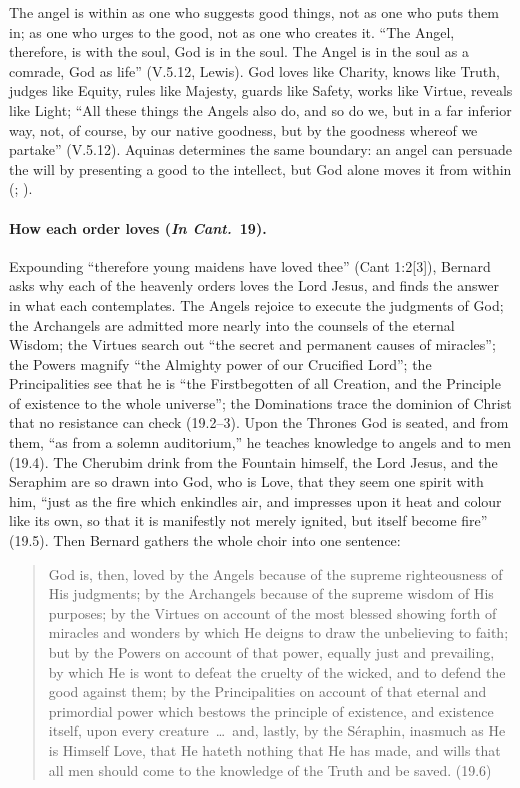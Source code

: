\noindent The angel is within as one who suggests good things, not as one
who puts them in; as one who urges to the good, not as one who creates it.
``The Angel, therefore, is with the soul, God is in the soul. The Angel is
in the soul as a comrade, God as life'' (V.5.12, Lewis). God loves like
Charity, knows like Truth, judges like Equity, rules like Majesty, guards
like Safety, works like Virtue, reveals like Light; ``All these things the
Angels also do, and so do we, but in a far inferior way, not, of course, by
our native goodness, but by the goodness whereof we partake'' (V.5.12).
Aquinas determines the same boundary: an angel can persuade the will by
presenting a good to the intellect, but God alone moves it from within
(; ).

\paragraph{How each order loves (\emph{In Cant.}\ 19).} Expounding
``therefore young maidens have loved thee'' (Cant 1:2[3]), Bernard asks why each
of the heavenly orders loves the Lord Jesus, and finds the answer in what
each contemplates. The Angels rejoice to execute the judgments of God; the
Archangels are admitted more nearly into the counsels of the eternal Wisdom;
the Virtues search out ``the secret and permanent causes of miracles'';
the Powers magnify ``the Almighty power of our Crucified Lord'';
the Principalities see that he is ``the Firstbegotten of all Creation, and
the Principle of existence to the whole universe''; the Dominations trace
the dominion of Christ that no resistance can check (19.2--3). Upon the
Thrones God is seated, and from them, ``as from a solemn auditorium,'' he
teaches knowledge to angels and to men (19.4). The Cherubim drink from the
Fountain himself, the Lord Jesus, and the Seraphim are so drawn into God,
who is Love, that they seem one spirit with him, ``just as the fire which
enkindles air, and impresses upon it heat and colour like its own, so that
it is manifestly not merely ignited, but itself become fire'' (19.5). Then
Bernard gathers the whole choir into one sentence:

\begin{quote}
God is, then, loved by the Angels because of the supreme righteousness of
His judgments; by the Archangels because of the supreme wisdom of His
purposes; by the Virtues on account of the most blessed showing forth of
miracles and wonders by which He deigns to draw the unbelieving to faith;
but by the Powers on account of that power, equally just and prevailing, by
which He is wont to defeat the cruelty of the wicked, and to defend the good
against them; by the Principalities on account of that eternal and
primordial power which bestows the principle of existence, and existence
itself, upon every creature~\dots\ and, lastly, by the Séraphin, inasmuch as
He is Himself Love, that He hateth nothing that He has made, and wills that
all men should come to the knowledge of the Truth and be saved. (19.6)
\end{quote}

